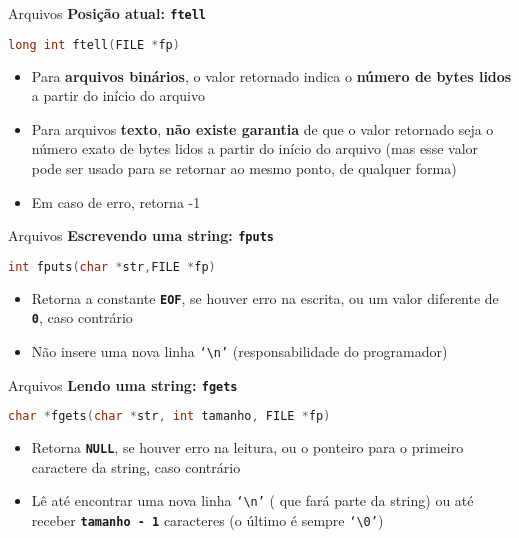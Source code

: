 \documentclass[10pt]{beamer}
\begin{document}
\begin{frame}[fragile]{Arquivos}
  \huge
  \textbf{Posição atual: \texttt{ftell}}
  \vfill
  \large
  \begin{lstlisting}[language=C]
long int ftell(FILE *fp)
  \end{lstlisting}
  \vfill
  \setlength{\leftmargini}{0pt}
  \begin{itemize}
      \item [] Para \textbf{arquivos binários}, o valor retornado indica o \textbf{número de bytes lidos} a partir do início do arquivo
      \item [] Para arquivos \textbf{texto}, \textbf{não existe garantia} de que o valor retornado seja o número exato de bytes lidos a partir do início do arquivo (mas esse valor pode ser usado para se retornar ao mesmo ponto, de qualquer forma)
      \item [] Em caso de erro, retorna -1
  \end{itemize}
\end{frame}

\begin{frame}[fragile]{Arquivos}
  \huge
  \textbf{Escrevendo uma string: \texttt{fputs}}
  \vfill
  \large
  \begin{lstlisting}[language=C]
int fputs(char *str,FILE *fp)
  \end{lstlisting}
  \vfill
  \setlength{\leftmargini}{0pt}
  \begin{itemize}
      \item [] Retorna a constante \textbf{\texttt{EOF}}, se houver erro na escrita, ou um valor diferente de \texttt{\textbf{0}}, caso contrário
      \item [] Não insere uma nova linha \texttt{`\textbackslash n'} (responsabilidade do programador)
  \end{itemize}
\end{frame}

\begin{frame}[fragile]{Arquivos}
  \huge
  \textbf{Lendo uma string: \texttt{fgets}}
  \vfill
  \large
  \begin{lstlisting}[language=C]
char *fgets(char *str, int tamanho, FILE *fp)
  \end{lstlisting}
  \vfill
  \setlength{\leftmargini}{0pt}
  \begin{itemize}
      \item [] Retorna \textbf{\texttt{NULL}}, se houver erro na leitura, ou o ponteiro para o primeiro caractere da string, caso contrário
      \item [] Lê até encontrar uma nova linha \texttt{`\textbackslash n'} (  que fará parte da string) ou até receber \texttt{\textbf{tamanho - 1}} caracteres (o último é sempre \texttt{`\textbackslash 0'})
  \end{itemize}
\end{frame}
\end{document}
